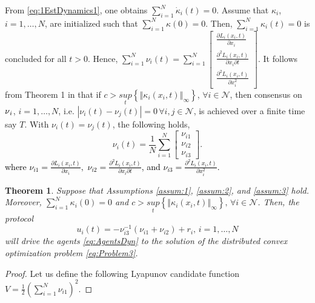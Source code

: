 \documentclass[letterpaper, 10 pt, conference]{ieeeconf}  %
\newtheorem{theorem}{Theorem}[section]
\newcommand{\crb}{\color{black}}
\begin{document}
{From \eqref{eq:1EstDynamics1}, one obtains $\sum_{i=1}^{N}\dot{\kappa}_{i}(t)=0$.
Assume that $\kappa_{i}$, $i=1,\ldots,N$, are initialized such that
$\sum_{i=1}^{N}\kappa(0)=0$. Then, $\sum_{i=1}^{N}\kappa_{i}(t)=0$
is concluded for all $t>0$. Hence, $\sum_{i=1}^{N}\nu_{i}(t)=\sum_{i=1}^{N}\left[{\displaystyle \begin{array}{c}
	\frac{\partial L_{i}(x_{i},t)}{\partial x_{i}}\\
	\frac{\partial^{2}L_{i}(x_{i},t)}{\partial x_{i}\partial t}\\
	\frac{\partial^{2}L_{i}(x_{i},t)}{\partial x_{i}^{2}}
	\end{array}}\right]$. It follows from Theorem 1 in \cite{chen2012distributed} that if
$c>\underset{t}{sup}\left\{ \left\Vert \kappa{}_{i}(x_{i},t)\right\Vert _{\infty}\right\} $,
$\forall i\in\mathcal{{N}}$, then consensus on $\text{\ensuremath{\nu}}_{i}$,
$i=1,\ldots,N$, i.e. {\crb $\left|\nu_{i}(t)-\nu_{j}(t)\right|=0\,\forall i,j \in \mathcal N$,}
is achieved {\crb  over a finite time} {\crb say $T$}.
With $\nu_{i}(t)=\nu_{j}(t)$, the following holds,
\begin{equation}
\nu_{i}(t)=\frac{1}{N}\sum_{i=1}^{N}\left[{\displaystyle \begin{array}{c}
	\nu_{i1}\\
	\nu_{i2}\\
	\nu_{i3}
	\end{array}}\right].\label{eq:1EstDyn4}
\end{equation}
\textcolor{black}{where $\nu_{i1}=\frac{\partial L_{i}(x_{i},t)}{\partial x_{i}},$
	$\nu_{i2}=\frac{\partial^{2}L_{i}(x_{i},t)}{\partial x_{i}\partial t}$,
	and $\nu_{i3}=\frac{\partial^{2}L_{i}(x_{i},t)}{\partial x_{i}^{2}}$.
}
\begin{theorem}
	Suppose that Assumptions \ref{assum:1}, \ref{assum:2}, and \ref{assum:3} hold. Moreover, $\sum_{i=1}^{N}\kappa_{i}(0)=0$
	and $c>\underset{t}{sup}\left\{ \left\Vert \kappa{}_{i}(x_{i},t)\right\Vert _{\infty}\right\} ,\,\forall i\in\mathcal{{N}}$.
	Then, the protocol
	\begin{equation}
	u_{i}(t)=-\nu_{i3}^{-1}\left(\nu_{i1}+\nu_{i2}\right)+r_{i},\,i=1,\ldots,N\label{eq:1DisEstLaw}
	\end{equation}
	will drive the agents \eqref{eq:AgentsDyn} to the solution of the
	distributed convex optimization problem \eqref{eq:Problem3}.\end{theorem}
\begin{proof}
	{\crb Let us} define the following Lyapunov candidate function $V=\frac{1}{2}\left(\sum_{i=1}^{N}\nu_{i1}\right)^{2}.$

\end{proof}}
\end{document}
